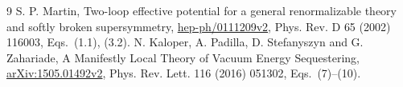 \documentclass[11pt]{article}
\begin{document}
\begin{thebibliography}{9}
 S. P. Martin, Two-loop effective potential for a general
renormalizable theory and softly broken supersymmetry,
\href{https://arxiv.org/pdf/hep-ph/0111209v2}{hep-ph/0111209v2},
Phys. Rev. D 65 (2002) 116003, Eqs.~(1.1), (3.2).
 N. Kaloper, A. Padilla, D. Stefanyszyn and
G. Zahariade, A Manifestly Local Theory of Vacuum Energy Sequestering,
\href{https://arxiv.org/pdf/1505.01492v2}{arXiv:1505.01492v2},
Phys. Rev. Lett. 116 (2016) 051302, Eqs.~(7)--(10).
\end{thebibliography}
\end{document}
